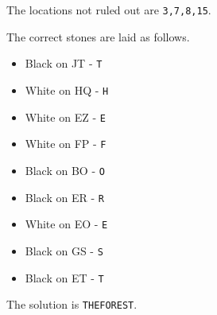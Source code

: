 

The locations not ruled out are \texttt{3,7,8,15}.


The correct stones are laid as follows.

\begin{multicols}{3}
\begin{itemize}
  \item Black on JT - \texttt{T}
  \item White on HQ - \texttt{H}
  \item White on EZ - \texttt{E}
  \item White on FP - \texttt{F}
  \item Black on BO - \texttt{O}
  \item Black on ER - \texttt{R}
  \item White on EO - \texttt{E}
  \item Black on GS - \texttt{S}
  \item Black on ET - \texttt{T}
\end{itemize}
\end{multicols}

The solution is \texttt{THEFOREST}.




